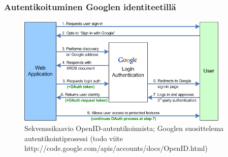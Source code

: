 \documentclass[finnish,gradu]{tktltiki}
\begin{document}
  \subsubsection{Autentikoituminen Googlen identiteetillä} %
  \label{sub:autentikoituminen_esiasetetulla_openid_identiteetintarjoajalla}

  \begin{figure}
    \centering
    \includegraphics[width=0.9\textwidth]{images/google_openid_diagram.png}
    \caption{Sekvenssikaavio OpenID-autentikoinnista; Googlen suosittelema autentikointiprosessi (todo viite http://code.google.com/apis/accounts/docs/OpenID.html)}
    \label{fig:sekvenssikaavio_google_openid}
  \end{figure}
\end{document}
